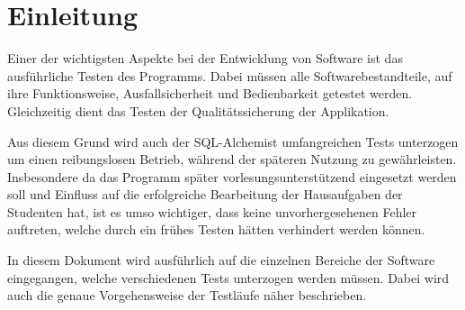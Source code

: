 
\chapter{Einleitung}

Einer der wichtigsten Aspekte bei der Entwicklung von Software ist das ausführliche Testen des Programms. Dabei müssen alle Softwarebestandteile, auf ihre Funktionsweise, Ausfallsicherheit und Bedienbarkeit getestet werden. Gleichzeitig dient das Testen der Qualitätssicherung der Applikation.

Aus diesem Grund wird auch der SQL-Alchemist umfangreichen Tests unterzogen um einen reibungslosen Betrieb, während der späteren Nutzung zu gewährleisten. Insbesondere da das Programm später vorlesungsunterstützend eingesetzt werden soll und Einfluss auf die erfolgreiche Bearbeitung der Hausaufgaben der Studenten hat, ist es umso wichtiger, dass keine unvorhergesehenen Fehler auftreten, welche durch ein frühes Testen hätten verhindert werden können.

In diesem Dokument wird ausführlich auf die einzelnen Bereiche der Software eingegangen, welche verschiedenen Tests unterzogen werden müssen. Dabei wird auch die genaue Vorgehensweise der Testläufe näher beschrieben. 